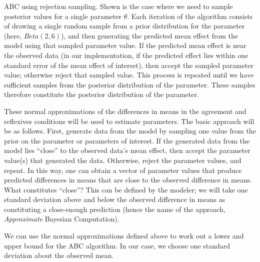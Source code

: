 \documentclass{cambridge7A}\usepackage[]{graphicx}\usepackage[]{color}
\begin{document}
\begin{algorithm}[H]
\SetAlgoLined
\caption{ABC using rejection sampling. Shown is the case where we need to sample posterior values for a single parameter $\theta$. Each iteration of the  algorithm consists of drawing a single random sample from a prior distribution for the parameter (here, $Beta(2,6)$), and then generating the predicted mean effect from the model using that sampled parameter value. If the predicted mean effect is near the observed data (in our implementation, if the predicted effect lies within one standard error of the mean effect of interest), then accept the sampled parameter value; otherwise reject that sampled value. This process is repeated until we have sufficient samples from the posterior distribution of the parameter. These samples therefore constitute the posterior distribution of the parameter.} \label{alg:abcrejection}
\end{algorithm}

These normal approximations of the differences in means in the  agreement and reflexives conditions will be used to estimate parameters. The basic approach will be as follows. First, generate data from the model by sampling one value from the prior on the parameter or parameters of interest. If the generated data from the model lies ``close'' to the observed data's mean effect, then accept the parameter value(s) that generated the data. Otherwise, reject the parameter values, and repeat. In this way, one can obtain a vector of parameter values that produce predicted differences in means that are close to the observed difference in means. What constitutes ``close''? This can be defined by the modeler; we will take one standard deviation above and below the observed difference in means as constituting a close-enough prediction (hence the name of the approach, \textit{Approximate} Bayesian Computation). 

We can use the normal approximations defined above to work out a lower and upper bound for the ABC algorithm. In our case, we choose one standard deviation about the observed mean. 
\end{document}
